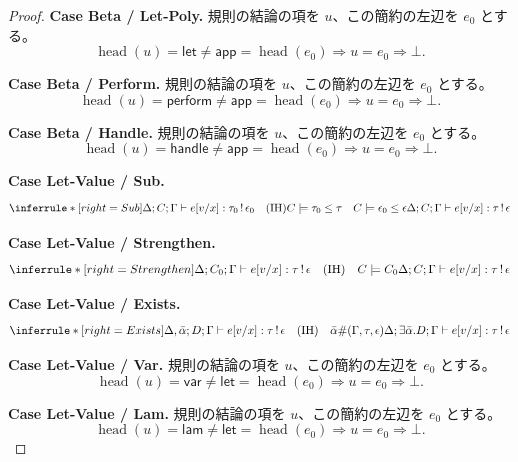 \documentclass[a4paper,11pt]{article}
\theoremstyle{definition}
\newenvironment{Case}[1]{\par\smallskip\noindent\textbf{Case #1.}\enspace\ignorespaces}{\par}
\newcommand{\jj}[6]{#1;#2;#3\vdash #4:#5\,!\,#6}
\begin{document}
\begin{proof}
\begin{Case}{Beta / Let-Poly}
規則の結論の項を $u$、この簡約の左辺を $e_0$ とする。
\[\operatorname{head}(u)=\mathsf{let}\ne\mathsf{app}
 =\operatorname{head}(e_0)\Longrightarrow u=e_0\Rightarrow\bot.\]
\end{Case}

\begin{Case}{Beta / Perform}
規則の結論の項を $u$、この簡約の左辺を $e_0$ とする。
\[\operatorname{head}(u)=\mathsf{perform}\ne\mathsf{app}
 =\operatorname{head}(e_0)\Longrightarrow u=e_0\Rightarrow\bot.\]
\end{Case}

\begin{Case}{Beta / Handle}
規則の結論の項を $u$、この簡約の左辺を $e_0$ とする。
\[\operatorname{head}(u)=\mathsf{handle}\ne\mathsf{app}
 =\operatorname{head}(e_0)\Longrightarrow u=e_0\Rightarrow\bot.\]
\end{Case}

\begin{Case}{Let-Value / Sub}
\[
\inferrule*[right=Sub]{\jj{\Delta}{C}{\Gamma}{e[v/x]}{\tau_0}{\epsilon_0}\quad(\mathrm{IH})\\ C\models\tau_0\leq\tau\quad C\models\epsilon_0\leq\epsilon}{\jj{\Delta}{C}{\Gamma}{e[v/x]}{\tau}{\epsilon}}
\]
\end{Case}

\begin{Case}{Let-Value / Strengthen}
\[
\inferrule*[right=Strengthen]{\jj{\Delta}{C_0}{\Gamma}{e[v/x]}{\tau}{\epsilon}\quad(\mathrm{IH})\quad C\models C_0}{\jj{\Delta}{C}{\Gamma}{e[v/x]}{\tau}{\epsilon}}
\]
\end{Case}

\begin{Case}{Let-Value / Exists}
\[
\inferrule*[right=Exists]{\jj{\Delta,\bar\alpha}{D}{\Gamma}{e[v/x]}{\tau}{\epsilon}\quad(\mathrm{IH})\quad\bar\alpha\#(\Gamma,\tau,\epsilon)}{\jj{\Delta}{\exists\bar\alpha.D}{\Gamma}{e[v/x]}{\tau}{\epsilon}}
\]
\end{Case}

\begin{Case}{Let-Value / Var}
規則の結論の項を $u$、この簡約の左辺を $e_0$ とする。
\[\operatorname{head}(u)=\mathsf{var}\ne\mathsf{let}
 =\operatorname{head}(e_0)\Longrightarrow u=e_0\Rightarrow\bot.\]
\end{Case}

\begin{Case}{Let-Value / Lam}
規則の結論の項を $u$、この簡約の左辺を $e_0$ とする。
\[\operatorname{head}(u)=\mathsf{lam}\ne\mathsf{let}
 =\operatorname{head}(e_0)\Longrightarrow u=e_0\Rightarrow\bot.\]
\end{Case}


\end{proof}
\end{document}

